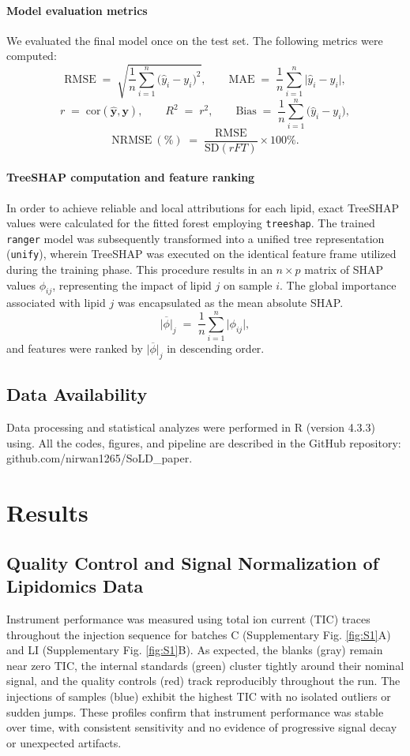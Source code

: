 \documentclass[10pt,letterpaper]{article}
\begin{document}
\paragraph{Model evaluation metrics}
We evaluated the final model once on the test set. The following metrics were computed:
\[
\mathrm{RMSE} \;=\; \sqrt{\frac{1}{n}\sum_{i=1}^{n}\bigl(\hat{y}_i - y_i\bigr)^2}, 
\qquad
\mathrm{MAE} \;=\; \frac{1}{n}\sum_{i=1}^{n}\bigl|\hat{y}_i - y_i\bigr|,
\]
\[
r \;=\; \mathrm{cor}(\hat{\bm{y}}, \bm{y}), 
\qquad
R^2 \;=\; r^2,
\qquad
\mathrm{Bias} \;=\; \frac{1}{n}\sum_{i=1}^{n}\bigl(\hat{y}_i - y_i\bigr),
\]
\[
\mathrm{NRMSE}~(\%) \;=\; \frac{\mathrm{RMSE}}{\mathrm{SD}(rFT)} \times 100\%.
\]

\paragraph{TreeSHAP computation and feature ranking}
In order to achieve reliable and local attributions for each lipid, exact TreeSHAP values were calculated for the fitted forest employing \texttt{treeshap}. The trained \texttt{ranger} model was subsequently transformed into a unified tree representation (\texttt{unify}), wherein TreeSHAP was executed on the identical feature frame utilized during the training phase. This procedure results in an \(n \times p\) matrix of SHAP values \(\phi_{ij}\), representing the impact of lipid \(j\) on sample \(i\). The global importance associated with lipid \(j\) was encapsulated as the mean absolute SHAP.\[
\overline{|\phi|}_j \;=\; \frac{1}{n}\sum_{i=1}^{n} \bigl|\phi_{ij}\bigr|,
\]
and features were ranked by \(\overline{|\phi|}_j\) in descending order.


\subsection*{Data Availability}
Data processing and statistical analyzes were performed in R (version 4.3.3) using. All the codes, figures, and pipeline are described in the GitHub repository: github.com/nirwan1265/SoLD\_paper.

\section*{Results}

\subsection*{Quality Control and Signal Normalization of Lipidomics Data}
Instrument performance was measured using total ion current (TIC) traces throughout the injection sequence for batches C (Supplementary Fig. \ref{fig:S1}A) and LI (Supplementary Fig. \ref{fig:S1}B). As expected, the blanks (gray) remain near zero TIC, the internal standards (green) cluster tightly around their nominal signal, and the quality controls (red) track reproducibly throughout the run. The injections of samples (blue) exhibit the highest TIC with no isolated outliers or sudden jumps. These profiles confirm that instrument performance was stable over time, with consistent sensitivity and no evidence of progressive signal decay or unexpected artifacts.
\end{document}
